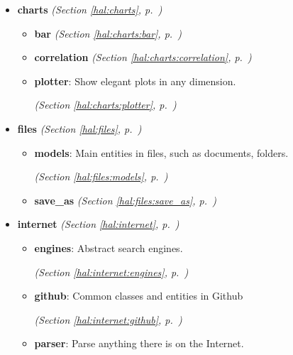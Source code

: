 \begin{itemize}
\setlength{\parskip}{0ex}
\item \textbf{charts}
  \textit{(Section \ref{hal:charts}, p.~\pageref{hal:charts})}

  \begin{itemize}
\setlength{\parskip}{0ex}
    \item \textbf{bar}
  \textit{(Section \ref{hal:charts:bar}, p.~\pageref{hal:charts:bar})}

    \item \textbf{correlation}
  \textit{(Section \ref{hal:charts:correlation}, p.~\pageref{hal:charts:correlation})}

    \item \textbf{plotter}: Show elegant plots in any dimension. 


  \textit{(Section \ref{hal:charts:plotter}, p.~\pageref{hal:charts:plotter})}

  \end{itemize}
\item \textbf{files}
  \textit{(Section \ref{hal:files}, p.~\pageref{hal:files})}

  \begin{itemize}
\setlength{\parskip}{0ex}
    \item \textbf{models}: Main entities in files, such as documents, folders. 


  \textit{(Section \ref{hal:files:models}, p.~\pageref{hal:files:models})}

    \item \textbf{save\_as}
  \textit{(Section \ref{hal:files:save_as}, p.~\pageref{hal:files:save_as})}

  \end{itemize}
\item \textbf{internet}
  \textit{(Section \ref{hal:internet}, p.~\pageref{hal:internet})}

  \begin{itemize}
\setlength{\parskip}{0ex}
    \item \textbf{engines}: Abstract search engines. 


  \textit{(Section \ref{hal:internet:engines}, p.~\pageref{hal:internet:engines})}

    \item \textbf{github}: Common classes and entities in Github 


  \textit{(Section \ref{hal:internet:github}, p.~\pageref{hal:internet:github})}

    \item \textbf{parser}: Parse anything there is on the Internet. 



\end{itemize}
\end{itemize}
